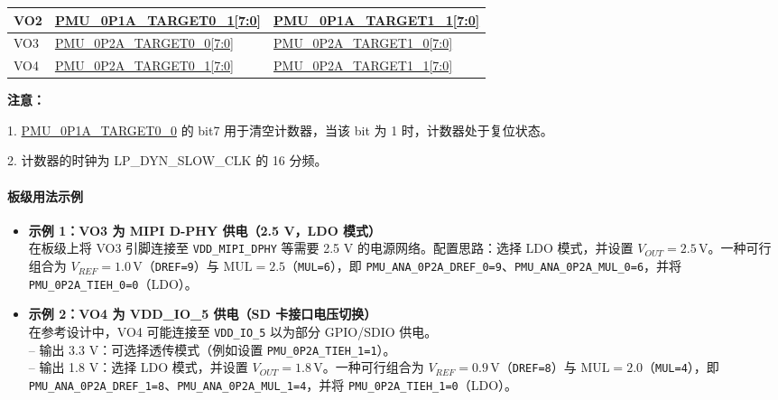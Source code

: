 \documentclass[main\_\_CN.tex]{subfiles}
\begin{document}
\begin{itemize}
\begin{table}[H]
\begin{threeparttable}
\begin{tabular}{|l|l|l|}
    VO2	& \hyperref[fielddesc:PMU0P1ATARGET01]{PMU\_0P1A\_TARGET0\_1[7:0]} & \hyperref[fielddesc:PMU0P1ATARGET11]{PMU\_0P1A\_TARGET1\_1[7:0]}\\\hline

    VO3	& \hyperref[fielddesc:PMU0P2ATARGET00]{PMU\_0P2A\_TARGET0\_0[7:0]} & \hyperref[fielddesc:PMU0P2ATARGET10]{PMU\_0P2A\_TARGET1\_0[7:0]}\\\hline

    VO4	& \hyperref[fielddesc:PMU0P2ATARGET01]{PMU\_0P2A\_TARGET0\_1[7:0]} & \hyperref[fielddesc:PMU0P2ATARGET11]{PMU\_0P2A\_TARGET1\_1[7:0]}\\\hline
    \end{tabular}
    \end{threeparttable}
    \end{table}

    \textbf{注意：}

    1. \hyperref[fielddesc:PMU0P1ATARGET00]{PMU\_0P1A\_TARGET0\_0} 的 bit7 用于清空计数器，当该 bit 为 1 时，计数器处于复位状态。

    2. 计数器的时钟为 LP\_DYN\_SLOW\_CLK 的 16 分频。

    \paragraph{板级用法示例}

    \begin{itemize}
    \item \textbf{示例 1：VO3 为 MIPI D-PHY 供电（2.5 V，LDO 模式）}\\
    在板级上将 VO3 引脚连接至 \texttt{VDD\_MIPI\_DPHY} 等需要 2.5 V 的电源网络。配置思路：选择 LDO 模式，并设置 \(V_{OUT}=2.5\,\mathrm{V}\)。一种可行组合为 \(V_{REF}=1.0\,\mathrm{V}\)（\texttt{DREF=9}）与 \(\mathrm{MUL}=2.5\)（\texttt{MUL=6}），即 \texttt{PMU\_ANA\_0P2A\_DREF\_0=9}、\texttt{PMU\_ANA\_0P2A\_MUL\_0=6}，并将 \texttt{PMU\_0P2A\_TIEH\_0=0}（LDO）。
    \item \textbf{示例 2：VO4 为 VDD\_IO\_5 供电（SD 卡接口电压切换）}\\
    在参考设计中，VO4 可能连接至 \texttt{VDD\_IO\_5} 以为部分 GPIO/SDIO 供电。\\
    -- 输出 3.3 V：可选择透传模式（例如设置 \texttt{PMU\_0P2A\_TIEH\_1=1}）。\\
    -- 输出 1.8 V：选择 LDO 模式，并设置 \(V_{OUT}=1.8\,\mathrm{V}\)。一种可行组合为 \(V_{REF}=0.9\,\mathrm{V}\)（\texttt{DREF=8}）与 \(\mathrm{MUL}=2.0\)（\texttt{MUL=4}），即 \texttt{PMU\_ANA\_0P2A\_DREF\_1=8}、\texttt{PMU\_ANA\_0P2A\_MUL\_1=4}，并将 \texttt{PMU\_0P2A\_TIEH\_1=0}（LDO）。
    \end{itemize}


\end{itemize}
\end{document}
